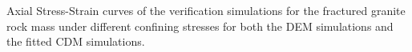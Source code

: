 \label{fig:fitted2} Axial Stress-Strain curves of the verification simulations for the fractured granite rock mass under different confining stresses for both the DEM simulations and the fitted CDM simulations.